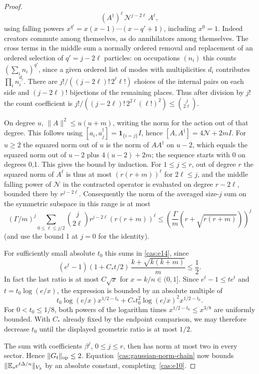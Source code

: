 \begin{proof}
\[
(A^\dagger)^\ell\,\mathcal N^{\underline{j-2\ell}}\, A^\ell,
\]
using falling powers \(x^{\underline{q'}}=x(x-1)\cdots(x-q'+1)\), including \(x^{\underline{0}}=1\). Indeed creators commute among themselves, as do annihilators among themselves. The cross terms in the middle sum a normally ordered removal and replacement of an ordered selection of \(q'=j-2\ell\) particles: on occupations \((n_i)\) this counts \((\sum_i n_i)^{\underline{q'}}\), since a given ordered list of modes with multiplicities \(d_i\) contributes \(\prod_i n_i^{\underline{d_i}}\). There are \(j!/((j-2\ell)!\,2^\ell\ell!)\) choices of the internal pairs on each side and \((j-2\ell)!\) bijections of the remaining places. Thus after division by \(j!\) the count coefficient is \(j!/((j-2\ell)!\,2^{2\ell}(\ell!)^2)\le \binom{j}{2\ell}\).

On degree \(u\), \(\|A\|^2\le u(u+m)\), writing the norm for the action out of that degree. This follows using \([a_i,a_j^\dagger]=\mathbf 1_{\{i=j\}}I\), hence \([A,A^\dagger]=4\mathcal N+2mI\). For \(u\ge2\) the squared norm out of \(u\) is the norm of \(A A^\dagger\) on \(u-2\), which equals the squared norm out of \(u-2\) plus \(4(u-2)+2m\); the sequence starts with 0 on degrees 0,1. This gives the bound by induction. For \(1\le j\le r\), out of degree \(r\) the squared norm of \(A^\ell\) is thus at most \((r(r+m))^\ell\) for \(2\ell\le j\), and the middle falling power of \(\mathcal N\) in the contracted operator is evaluated on degree \(r-2\ell\), bounded there by \(r^{j-2\ell}\). Consequently the norm of the averaged size-\(j\) sum on the symmetric subspace in this range is at most
\[
(\Gamma/m)^j\sum_{0\le \ell\le j/2}\binom{j}{2\ell} r^{j-2\ell}(r(r+m))^\ell
\le \left(\frac{\Gamma}{m}(r+\sqrt{r(r+m)})\right)^j
\]
(and use the bound 1 at \(j=0\) for the identity).

For sufficiently small absolute \(t_0\) this sums in \eqref{cas:e14}, since
\[
(e^t-1)(1+C_*t/2)\,\frac{k+\sqrt{k(k+m)}}{m}\le\frac12 .
\]
In fact the last ratio is at most $C\sqrt{x}$ for $x=k/n\in(0,1]$.
Since $e^t-1\le te^t$ and $t=t_0\log(e/x)$, the expression is bounded
by an absolute multiple of
\[
 t_0\log(e/x)x^{1/2-t_0}
 +C_*t_0^2\log(e/x)^2x^{1/2-t_0}.
\]
For $0<t_0\le1/8$, both powers of the logarithm times
$x^{1/2-t_0}\le x^{3/8}$ are uniformly bounded. With $C_*$ already
fixed by the endpoint comparison, we may therefore decrease $t_0$
until the displayed geometric ratio is at most $1/2$.

The sum with coefficients $\beta^j$, $0\le j\le r$, then has norm
at most two in every sector. Hence $\|G_t\|_{\mathrm{op}}\le2$.
Equation~\eqref{cas:gaussian-norm-chain} now bounds
$\|\mathbb E_s e^{t\Delta/n}\|_{V_\lambda}$ by an absolute constant,
completing~\eqref{cas:e10}.
\end{proof}

